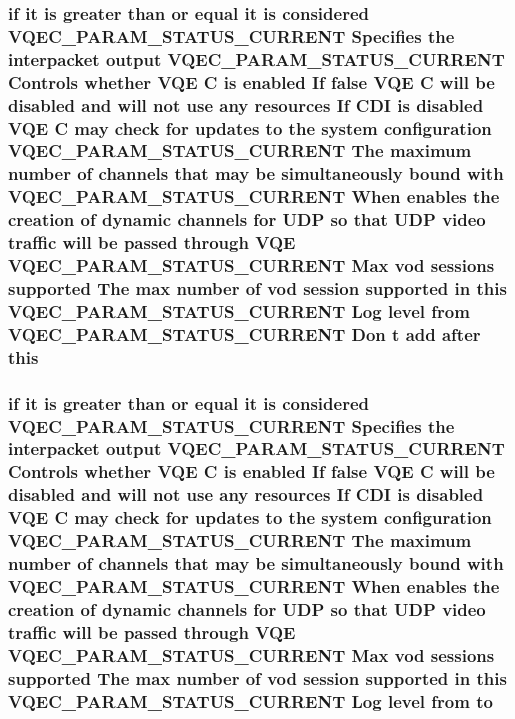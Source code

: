 \subsubsection{\setlength{\rightskip}{0pt plus 5cm}if it is greater than or equal it is considered VQEC\_\-PARAM\_\-STATUS\_\-CURRENT Specifies the interpacket output VQEC\_\-PARAM\_\-STATUS\_\-CURRENT Controls whether VQE \bf{C} is enabled If false VQE \bf{C} will be disabled and will not use any resources If CDI is disabled VQE \bf{C} may check for updates \bf{to} the system configuration VQEC\_\-PARAM\_\-STATUS\_\-CURRENT The maximum number of \bf{channels} that may be simultaneously bound with VQEC\_\-PARAM\_\-STATUS\_\-CURRENT When enables the creation of dynamic \bf{channels} for UDP so that UDP video traffic will be passed through VQE VQEC\_\-PARAM\_\-STATUS\_\-CURRENT Max vod sessions supported The max number of vod session supported in \bf{this} VQEC\_\-PARAM\_\-STATUS\_\-CURRENT Log level from VQEC\_\-PARAM\_\-STATUS\_\-CURRENT Don t add after \bf{this}}\label{vqec__cfg__settings_8h_9451079fa177e510349a6d9e24ea0ae5}


\subsubsection{\setlength{\rightskip}{0pt plus 5cm}if it is greater than or equal it is considered VQEC\_\-PARAM\_\-STATUS\_\-CURRENT Specifies the interpacket output VQEC\_\-PARAM\_\-STATUS\_\-CURRENT Controls whether VQE \bf{C} is enabled If false VQE \bf{C} will be disabled and will not use any resources If CDI is disabled VQE \bf{C} may check for updates \bf{to} the system configuration VQEC\_\-PARAM\_\-STATUS\_\-CURRENT The maximum number of \bf{channels} that may be simultaneously bound with VQEC\_\-PARAM\_\-STATUS\_\-CURRENT When enables the creation of dynamic \bf{channels} for UDP so that UDP video traffic will be passed through VQE VQEC\_\-PARAM\_\-STATUS\_\-CURRENT Max vod sessions supported The max number of vod session supported in \bf{this} VQEC\_\-PARAM\_\-STATUS\_\-CURRENT Log level from \bf{to}}\label{vqec__cfg__settings_8h_1e4735bd0370a5336430b00a24c1cc30}


